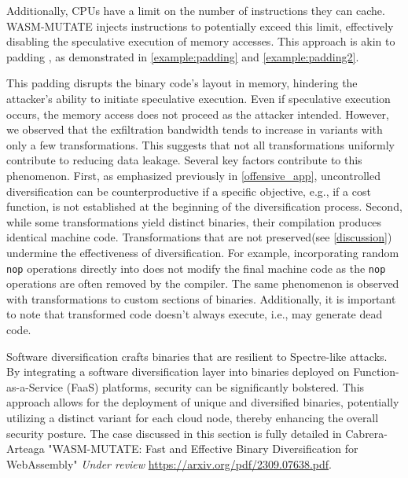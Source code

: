 

 Additionally, CPUs have a limit on the number of instructions they can cache. 
WASM-MUTATE injects instructions to potentially exceed this limit, effectively disabling the speculative execution of memory accesses. 
This approach is akin to padding \cite{padding}, as demonstrated in \autoref{example:padding} and \autoref{example:padding2}.


This padding disrupts the binary code's layout in memory, hindering the attacker's ability to initiate speculative execution. 
Even if speculative execution occurs, the memory access does not proceed as the attacker intended.
However, we observed that the exfiltration bandwidth tends to increase in variants with only a few transformations. 
This suggests that not all transformations uniformly contribute to reducing data leakage. 
Several key factors contribute to this phenomenon.
First, as emphasized previously in \autoref{offensive_app}, uncontrolled diversification can be counterproductive if a specific objective, e.g., if a cost function, is not established at the beginning of the diversification process.
Second, while some transformations yield distinct \wasm binaries, their compilation produces identical machine code.
Transformations that are not preserved(see \autoref{discussion}) undermine the effectiveness of diversification.
For example, incorporating random \texttt{nop} operations directly into \wasm does not modify the final machine code as the \texttt{nop} operations are often removed by the compiler.
The same phenomenon is observed with transformations to custom sections of \Wasm binaries.
Additionally, it is important to note that transformed code doesn't always execute, i.e., \tool may generate dead code.






\begin{tcolorbox}[title=Contribution paper,boxrule=1pt,arc=.2em,boxsep=1.0mm]
    Software diversification crafts \Wasm binaries that are resilient to Spectre-like attacks. 
    By integrating a software diversification layer into \Wasm binaries deployed on Function-as-a-Service (FaaS) platforms, security can be significantly bolstered. 
    This approach allows for the deployment of unique and diversified \Wasm binaries, potentially utilizing a distinct variant for each cloud node, thereby enhancing the overall security posture.
    The case discussed in this section is fully detailed in Cabrera-Arteaga \etal "WASM-MUTATE: Fast and Effective Binary Diversification for WebAssembly"
    \emph{Under review}
    \url{https://arxiv.org/pdf/2309.07638.pdf}. 
\end{tcolorbox}



